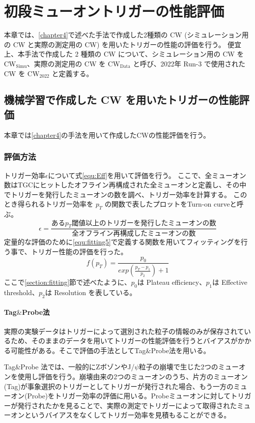 \chapter{初段ミューオントリガーの性能評価}\label{chapter5}
本章では、\ref{chapter4}で述べた手法で作成した2種類の CW (シミュレーション用の CW と実際の測定用の CW) を用いたトリガーの性能の評価を行う。
便宜上、本手法で作成した 2 種類の CW について、シミュレーション用の CW を $\mathrm{CW_{Simu}}$、実際の測定用の CW を $\mathrm{CW_{Data}}$ と呼び、2022年 Run-3 で使用された CW を $\mathrm{CW_{2022}}$ と定義する。

\section{機械学習で作成した CW を用いたトリガーの性能評価}
本章では\ref{chapter4}の手法を用いて作成したCWの性能評価を行う。
\subsection{評価方法}
トリガー効率$\epsilon$について式\ref{equ:Eff}を用いて評価を行う。
ここで、全ミューオン数はTGCにヒットしたオフライン再構成された全ミューオンと定義し、その中でトリガーを発行したミューオンの数を調べ、トリガー効率を計算する。
このとき得られるトリガー効率を $p_T$ の関数で表したプロットをTurn-on curveと呼ぶ。
\begin{equation}
　   \epsilon = \frac{ある p_T 閾値以上のトリガーを発行したミューオンの数}{全オフライン再構成したミューオンの数}
　\label{equ:Eff}
\end{equation}
定量的な評価のために\eqref{equ:fitting5}で定義する関数を用いてフィッティングを行う事で、トリガー性能の評価を行った。
\begin{equation}
    f(p_T) = \frac{p_0}{exp(\frac{p_T-p_1}{p_2})+1}
　\label{equ:fitting5}
\end{equation}
ここで\ref{section:fitting}節で述べたように、$p_0$は Plateau efficiency、$p_1$は Effective threshold、$p_2$は Resolution を表している。

\subsubsection{Tag$\&$Probe法}
実際の実験データはトリガーによって選別された粒子の情報のみが保存されているため、そのままのデータを用いてトリガーの性能評価を行うとバイアスがかかる可能性がある。そこで評価の手法としてTag$\&$Probe法を用いる。

Tag$\&$Probe 法では、一般的にZボゾンやJ/$\psi$粒子の崩壊で生じた2つのミューオンを使用し評価を行う。崩壊由来の2つのミューオンのうち、片方のミューオン(Tag)が事象選択のトリガーとしてトリガーが発行された場合、もう一方のミューオン(Probe)をトリガー効率の評価に用いる。Probeミューオンに対してトリガーが発行されたかを見ることで、実際の測定でトリガーによって取得されたミューオンというバイアスをなくしてトリガー効率を見積もることができる。

